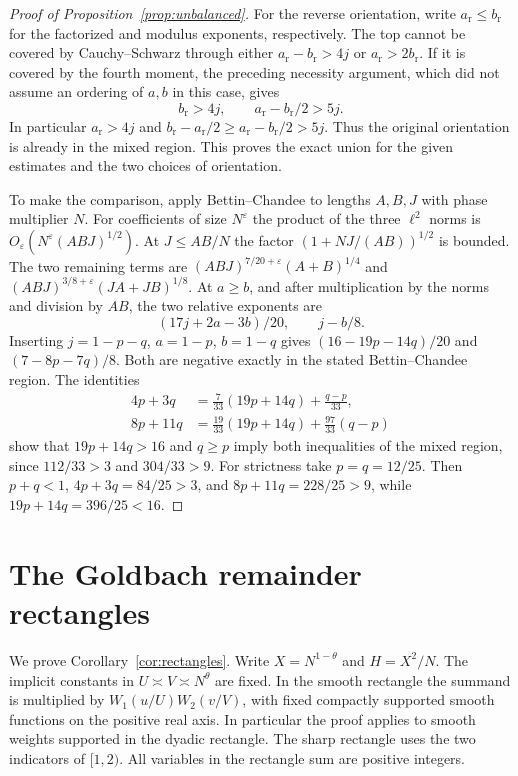 \documentclass[11pt]{amsart}
\numberwithin{equation}{section}
\theoremstyle{remark}
\begin{document}
\begin{proof}[Proof of Proposition~\ref{prop:unbalanced}]
For the reverse orientation, write \(a_{\mathrm r}\le b_{\mathrm r}\)
for the factorized and modulus exponents, respectively. The top cannot
be covered by Cauchy--Schwarz through either
\(a_{\mathrm r}-b_{\mathrm r}>4j\) or
\(a_{\mathrm r}>2b_{\mathrm r}\).
If it is covered by the fourth moment, the preceding necessity
argument, which did not assume an ordering of \(a,b\) in this case,
gives
\[
 b_{\mathrm r}>4j,\qquad a_{\mathrm r}-b_{\mathrm r}/2>5j .
\]
In particular \(a_{\mathrm r}>4j\) and
\(b_{\mathrm r}-a_{\mathrm r}/2\ge a_{\mathrm r}-b_{\mathrm r}/2>5j\).
Thus the original orientation is already in the mixed region. This
proves the exact union for the given estimates and the two choices of
orientation.

To make the comparison, apply Bettin--Chandee
\cite[Theorem~1]{BC} to lengths \(A,B,J\) with phase multiplier \(N\).
For coefficients of size \(N^\varepsilon\) the product of the three
\(\ell^2\) norms is \(O_\varepsilon(N^\varepsilon(ABJ)^{1/2})\).
At \(J\le AB/N\) the factor \((1+NJ/(AB))^{1/2}\) is bounded.
The two remaining terms are
\((ABJ)^{7/20+\varepsilon}(A+B)^{1/4}\) and
\((ABJ)^{3/8+\varepsilon}(JA+JB)^{1/8}\).
At \(a\ge b\), and after multiplication by the norms and division
by \(AB\), the two relative exponents are
\[
  (17j+2a-3b)/20,\qquad j-b/8 .
\]
Inserting \(j=1-p-q\), \(a=1-p\), \(b=1-q\) gives
\((16-19p-14q)/20\) and \((7-8p-7q)/8\). Both are negative exactly
in the stated Bettin--Chandee region.
The identities
\[
\begin{aligned}
 4p+3q&=\frac7{33}(19p+14q)+\frac{q-p}{33},\\
 8p+11q&=\frac{19}{33}(19p+14q)+\frac{97}{33}(q-p)
\end{aligned}
\]
show that \(19p+14q>16\) and \(q\ge p\) imply both inequalities of
the mixed region, since \(112/33>3\) and \(304/33>9\).
For strictness take \(p=q=12/25\). Then \(p+q<1\),
\(4p+3q=84/25>3\), and \(8p+11q=228/25>9\), while
\(19p+14q=396/25<16\).
\end{proof}

\section{The Goldbach remainder rectangles}\label{sec:rectangles}

We prove Corollary~\ref{cor:rectangles}. Write \(X=N^{1-\theta}\) and
\(H=X^2/N\). The implicit constants in \(U\asymp V\asymp N^\theta\)
are fixed. In the smooth rectangle the summand is multiplied by
\(W_1(u/U)W_2(v/V)\), with fixed compactly supported smooth functions
on the positive real axis. In particular the proof applies to smooth
weights supported in the dyadic rectangle. The sharp rectangle uses the
two indicators of \([1,2)\). All variables in the rectangle sum are
positive integers.
\end{document}

